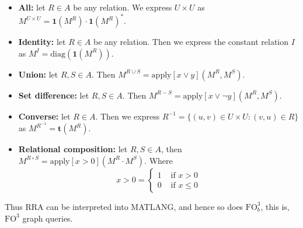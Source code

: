 \begin{itemize}
	\item \textbf{All:} let $R\in A$ be any relation. We express $U\times U$ as $M^{U\times U}=\mathbf{1}(M^R)\cdot\mathbf{1}(M^R)^*.$
	\item \textbf{Identity:} let $R\in A$ be any relation. Then we express the constant relation $I$ as $M^I=\text{diag}(\mathbf{1}(M^R)).$
	\item \textbf{Union:} let $R,S\in A$. Then $M^{R\cup S}=\text{apply}[x\vee y](M^R,M^S).$
	\item \textbf{Set difference:} let $R,S\in A$. Then $M^{R-S}=\text{apply}[x\vee\neg y](M^R, M^S).$
	\item \textbf{Converse:} let $R\in A$. Then we express $R^{-1}=\lbrace (u,v)\in U\times U: (v,u)\in R\rbrace$ as $M^{R^{-1}}=\mathbf{t}(M^R).$
	\item \textbf{Relational composition:} let $R,S\in A$, then $M^{R\circ S}=\text{apply}[x>0](M^R\cdot M^S).$ Where 
	\[ x>0=
    \begin{cases} 
      1 & \text{ if } x>0 \\
      0 & \text{ if } x\leq 0 
    \end{cases}
	\]
\end{itemize}

Thus RRA can be interpreted into MATLANG,  and hence so does $\text{FO}^3_b$, this is, $\text{FO}^3$ graph queries.

